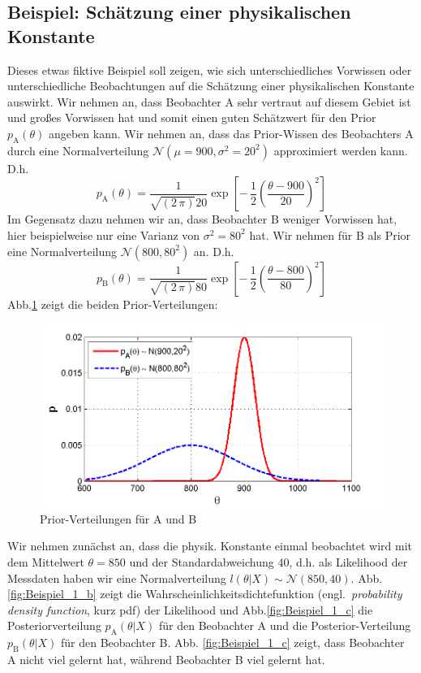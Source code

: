 \subsection{Beispiel: Schätzung einer physikalischen Konstante}
Dieses etwas fiktive Beispiel soll zeigen, wie sich unterschiedliches Vorwissen oder unterschiedliche Beobachtungen auf die Schätzung einer physikalischen Konstante auswirkt.
Wir nehmen an, dass Beobachter A sehr vertraut auf diesem Gebiet ist und
großes Vorwissen hat und somit einen guten Schätzwert für den Prior $p_\mathrm{A}(\theta)$ angeben kann. Wir nehmen an, dass das Prior-Wissen des Beobachters A durch eine Normalverteilung $\mathcal{N}(\mu = 900, \sigma^2=20^2)$ approximiert werden
kann. D.h.
\[
p_\mathrm{A}(\theta) = \frac{1}{\sqrt{(2\,\pi)} 20} \exp \left[ -\, \frac{1}{2}
\left(\frac{\theta -900}{20}
\right)^2 \right]
\]
Im Gegensatz dazu nehmen wir an, dass Beobachter B weniger Vorwissen
hat, hier beispielweise nur eine Varianz von $\sigma^2 = 80^2$ hat.
Wir nehmen für B als Prior eine Normalverteilung $\mathcal{N}(800,80^2)$ an.
D.h.
\[
p_\mathrm{B}(\theta) = \frac{1}{\sqrt{(2\,\pi)} 80} \exp \left[ -\, \frac{1}{2}
\left(\frac{\theta -800}{80}
\right)^2 \right]
\]
Abb.\ref{fig:Beispiel_1_a} zeigt die beiden Prior-Verteilungen:
\begin{figure}[!h]
	\begin{center}
		\includegraphics[width=130mm]{12_vorlesung_GUMS2/media/prior_A_Prior_B.png}
		\caption{\label{fig:Beispiel_1_a} Prior-Verteilungen für A und B}
	\end{center}
\end{figure}
Wir nehmen zunächst an, dass die physik. Konstante einmal beobachtet wird mit
dem Mittelwert $\theta = 850$ und der Standardabweichung 40, d.h.
als Likelihood der Messdaten haben wir eine Normalverteilung $l(\theta|X) \sim \mathcal{N}(850,40)$.
Abb.\ref{fig:Beispiel_1_b} zeigt die Wahrscheinlichkeitsdichtefunktion (engl.\ \textsl{probability density function}, kurz pdf) der Likelihood und Abb.\ref{fig:Beispiel_1_c}
die Posteriorverteilung $p_\mathrm{A}(\theta|X)$ für den Beobachter A und die Posterior-Verteilung $p_\mathrm{B}(\theta|X)$ für den Beobachter B. Abb. \ref{fig:Beispiel_1_c}
zeigt, dass Beobachter A nicht viel gelernt hat, während Beobachter B viel gelernt hat.

